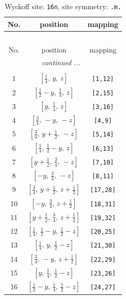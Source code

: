 \documentclass[fleqn,8pt]{jsarticle}
\begin{document}
\renewcommand{\arraystretch}{1.2}
\begin{longtable}{ccc}
\caption{Wyckoff site: {\tt 16n}, site symmetry: {\tt .m.}}
 \\
 \hline \hline
No. & position & mapping \\ \hline \endfirsthead

\multicolumn{2}{l}{\tablename\ \thetable{}} \\
 \hline \hline
No. & position & mapping \\ \hline \endhead

 \hline \hline
\multicolumn{2}{r}{\footnotesize\it continued ...} \\ \endfoot

 \hline \hline
\multicolumn{2}{r}{} \\ \endlastfoot

1 & $\left[ \frac{1}{4},\, y,\, z \right]$ & {\tt [1,12]} \\ \hline
2 & $\left[ \frac{1}{2} - y,\, \frac{1}{4},\, z \right]$ & {\tt [2,15]} \\ \hline
3 & $\left[ y,\, \frac{1}{4},\, z \right]$ & {\tt [3,16]} \\ \hline
4 & $\left[ \frac{3}{4},\, - y,\, - z \right]$ & {\tt [4,9]} \\ \hline
5 & $\left[ \frac{3}{4},\, y + \frac{1}{2},\, - z \right]$ & {\tt [5,14]} \\ \hline
6 & $\left[ \frac{1}{4},\, \frac{1}{2} - y,\, z \right]$ & {\tt [6,13]} \\ \hline
7 & $\left[ y + \frac{1}{2},\, \frac{3}{4},\, - z \right]$ & {\tt [7,10]} \\ \hline
8 & $\left[ - y,\, \frac{3}{4},\, - z \right]$ & {\tt [8,11]} \\ \hline
9 & $\left[ \frac{3}{4},\, y + \frac{1}{2},\, z + \frac{1}{2} \right]$ & {\tt [17,28]} \\ \hline
10 & $\left[ - y,\, \frac{3}{4},\, z + \frac{1}{2} \right]$ & {\tt [18,31]} \\ \hline
11 & $\left[ y + \frac{1}{2},\, \frac{3}{4},\, z + \frac{1}{2} \right]$ & {\tt [19,32]} \\ \hline
12 & $\left[ \frac{1}{4},\, \frac{1}{2} - y,\, \frac{1}{2} - z \right]$ & {\tt [20,25]} \\ \hline
13 & $\left[ \frac{1}{4},\, y,\, \frac{1}{2} - z \right]$ & {\tt [21,30]} \\ \hline
14 & $\left[ \frac{3}{4},\, - y,\, z + \frac{1}{2} \right]$ & {\tt [22,29]} \\ \hline
15 & $\left[ y,\, \frac{1}{4},\, \frac{1}{2} - z \right]$ & {\tt [23,26]} \\ \hline
16 & $\left[ \frac{1}{2} - y,\, \frac{1}{4},\, \frac{1}{2} - z \right]$ & {\tt [24,27]} \\
\end{longtable}
\end{document}
